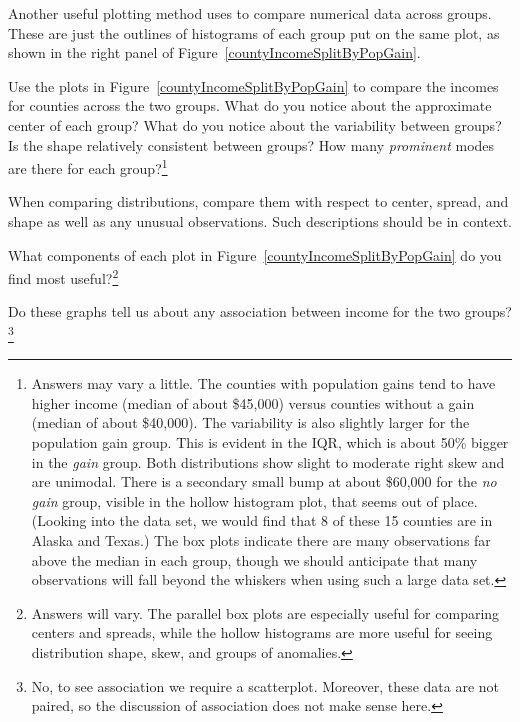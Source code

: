 Another useful plotting method uses  to compare numerical data across groups. These are just the outlines of histograms of each group put on the same plot, as shown in the right panel of Figure~\ref{countyIncomeSplitByPopGain}.

\begin{exercise} \label{comparingPriceByTypeExercise}
Use the plots in Figure~\ref{countyIncomeSplitByPopGain} to compare the incomes for counties across the two groups. What do you notice about the approximate center of each group? What do you notice about the variability between groups? Is the shape relatively consistent between groups? How many \emph{prominent} modes are there for each group?\footnote{Answers may vary a little. The counties with population gains tend to have higher income (median of about \$45,000) versus counties without a gain (median of about \$40,000). The variability is also slightly larger for the population gain group. This is evident in the IQR, which is about 50\% bigger in the \emph{gain} group. Both distributions show slight to moderate right skew and are unimodal. There is a secondary small bump at about \$60,000 for the \emph{no gain} group, visible in the hollow histogram plot, that seems out of place. (Looking into the data set, we would find that 8 of these 15 counties are in Alaska and Texas.) The box plots indicate there are many observations far above the median in each group, though we should anticipate that many observations will fall beyond the whiskers when using such a large data set.}
\end{exercise}

\begin{tipBox}{
When comparing distributions, compare them with respect to center, spread, and shape as well as any unusual observations. Such descriptions should be in context.}
\end{tipBox}

\begin{exercise}
What components of each plot in Figure~\ref{countyIncomeSplitByPopGain} do you find most useful?\footnote{Answers will vary. The parallel box plots are especially useful for comparing centers and spreads, while the hollow histograms are more useful for seeing distribution shape, skew, and groups of anomalies.}
\end{exercise}

\begin{exercise}
Do these graphs tell us about any association between income for the two groups?\footnote{No, to see association we require a scatterplot. Moreover, these data are not paired, so the discussion of association does not make sense here.}
\end{exercise}

